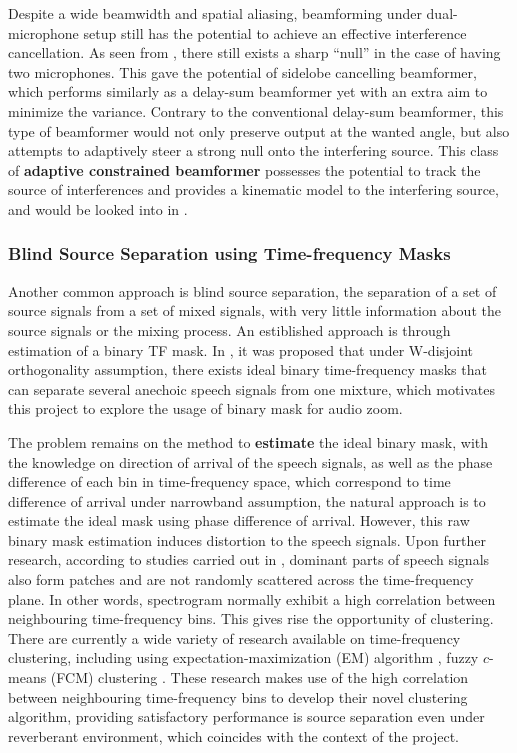 \documentclass[a4paper,twoside,12pt,hidelinks]{article}
\begin{document}
Despite a wide beamwidth and spatial aliasing, beamforming under dual-microphone setup still has the potential to achieve an effective interference cancellation. As seen from , there still exists a sharp ``null'' in the case of having two microphones. This gave the potential of sidelobe cancelling beamformer, which performs similarly as a delay-sum beamformer yet with an extra aim to minimize the variance. Contrary to the conventional delay-sum beamformer, this type of beamformer would not only preserve output at the wanted angle, but also attempts to adaptively steer a strong null onto the interfering source. This class of \textbf{adaptive constrained beamformer} possesses the potential to track the source of interferences and provides a kinematic model to the interfering source, and would be looked into in . 

\subsubsection{Blind Source Separation using Time-frequency Masks}
\label{section:mask}
Another common approach is blind source separation, the separation of a set of source signals from a set of mixed signals, with very little information about the source signals or the mixing process. An estiblished approach is through estimation of a binary TF mask. In \cite{Yilmaz2004BlindMasking}, it was proposed that under W-disjoint orthogonality assumption, there exists ideal binary time-frequency masks that can separate several anechoic speech signals from one mixture, which motivates this project to explore the usage of binary mask for audio zoom.

The problem remains on the method to \textbf{estimate} the ideal binary mask, with the knowledge on direction of arrival of the speech signals, as well as the phase difference of each bin in time-frequency space, which correspond to time difference of arrival under narrowband assumption, the natural approach is to estimate the ideal mask using phase difference of arrival. However, this raw binary mask estimation induces distortion to the speech signals. \cite{Blin2005UnderdeterminedEstimation} Upon further research, according to studies carried out in \cite{Faller2004SourceCoherence}, dominant parts of speech signals also form patches and are not randomly scattered across the time-frequency plane. In other words, spectrogram normally exhibit a high correlation between neighbouring time-frequency bins. This gives rise the opportunity of clustering. There are currently a wide variety of research available on time-frequency clustering, including using expectation-maximization (EM) algorithm \cite{Sawada2011UnderdeterminedAlignment}, fuzzy $c$-means (FCM) clustering \cite{Jafari2014Time-frequencySeparation,Kuhne2010ASeparation}. These research makes use of the high correlation between neighbouring time-frequency bins to develop their novel clustering algorithm, providing satisfactory performance is source separation even under reverberant environment, which coincides with the context of the project.
\end{document}
